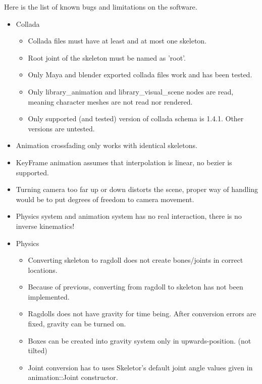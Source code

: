\documentclass[11pt,twoside,a4paper]{article}
\begin{document}
Here is the list of known bugs and limitations on the software.

\begin{itemize}
  \item Collada
  \begin{itemize}
    \item Collada files must have at least and at most one skeleton.
    \item Root joint of the skeleton must be named as 'root'.
    \item Only Maya and blender exported collada files work and has been tested.
    \item Only library\_animation and library\_visual\_scene nodes are read, meaning character meshes are not read nor rendered.
    \item Only supported (and tested) version of collada schema is 1.4.1. Other versions are untested.
  \end{itemize}
  \item Animation crossfading only works with identical skeletons.
  \item KeyFrame animation assumes that interpolation is linear, no bezier is supported.
  \item Turning camera too far up or down distorts the scene, proper way of handling would be to put degrees of freedom to camera movement.
  \item Physics system and animation system has no real interaction, there is no inverse kinematics!
  \item Physics
  \begin{itemize}
    \item Converting skeleton to ragdoll does not create bones/joints in correct locations.
    \item Because of previous, converting from ragdoll to skeleton has not been implemented.
    \item Ragdolls does not have gravity for time being. After conversion errors are fixed, gravity can be turned on.
    \item Boxes can be created into gravity system only in upwards-position. (not tilted)
    \item Joint conversion has to uses Skeletor's default joint angle values given in animation::Joint constructor.
  \end{itemize}
\end{itemize}
\end{document}
